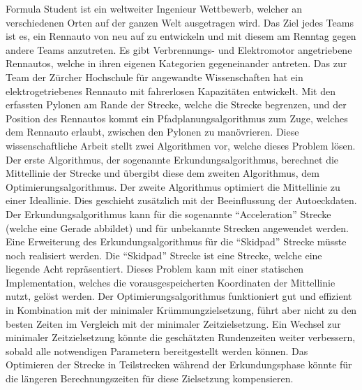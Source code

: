 Formula Student ist ein weltweiter Ingenieur Wettbewerb, welcher an verschiedenen Orten auf der ganzen Welt ausgetragen wird. Das Ziel jedes Teams ist es, ein Rennauto von neu auf zu entwickeln und mit diesem am Renntag gegen andere Teams anzutreten. Es gibt Verbrennungs- und Elektromotor angetriebene Rennautos, welche in ihren eigenen Kategorien gegeneinander antreten. Das \acrlong{zur} Team der Zürcher Hochschule für angewandte Wissenschaften hat ein elektrogetriebenes Rennauto mit fahrerlosen Kapazitäten entwickelt. Mit den erfassten Pylonen am Rande der Strecke, welche die Strecke begrenzen, und der Position des Rennautos kommt ein Pfadplanungsalgorithmus zum Zuge, welches dem Rennauto erlaubt, zwischen den Pylonen zu manövrieren. Diese wissenschaftliche Arbeit stellt zwei Algorithmen vor, welche dieses Problem lösen. Der erste Algorithmus, der sogenannte Erkundungsalgorithmus, berechnet die Mittellinie der Strecke und übergibt diese dem zweiten Algorithmus, dem Optimierungsalgorithmus. Der zweite Algorithmus optimiert die Mittellinie zu einer Ideallinie. Dies geschieht zusätzlich mit der Beeinflussung der Autoeckdaten. Der Erkundungsalgorithmus kann für die sogenannte ``Acceleration'' Strecke (welche eine Gerade abbildet) und für unbekannte Strecken angewendet werden. Eine Erweiterung des Erkundungsalgorithmus für die ``Skidpad'' Strecke müsste noch realisiert werden. Die ``Skidpad'' Strecke ist eine Strecke, welche eine liegende Acht repräsentiert. Dieses Problem kann mit einer statischen Implementation, welches die vorausgespeicherten Koordinaten der Mittellinie nutzt, gelöst werden. Der Optimierungsalgorithmus funktioniert gut und effizient in Kombination mit der minimaler Krümmungzielsetzung, führt aber nicht zu den besten Zeiten im Vergleich mit der minimaler Zeitzielsetzung. Ein Wechsel zur minimaler Zeitzielsetzung könnte die geschätzten Rundenzeiten weiter verbessern, sobald alle notwendigen Parametern bereitgestellt werden können. Das Optimieren der Strecke in Teilstrecken während der Erkundungsphase könnte für die längeren Berechnungszeiten für diese Zielsetzung kompensieren.
